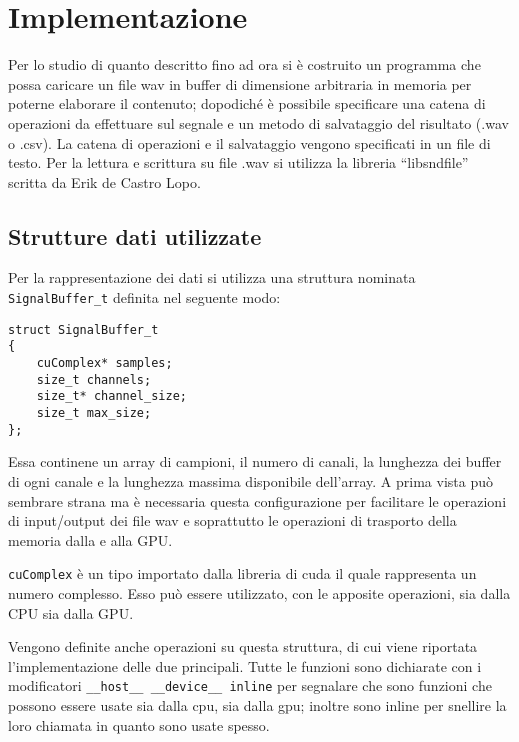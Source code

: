 \chapter{Implementazione}
Per lo studio di quanto descritto fino ad ora si è costruito un programma che possa caricare un file wav in buffer di dimensione arbitraria in memoria per poterne elaborare il contenuto; dopodiché è possibile specificare una catena di operazioni da effettuare sul segnale e un metodo di salvataggio del risultato (.wav o .csv). La catena di operazioni e il salvataggio vengono specificati in un file di testo. Per la lettura e scrittura su file .wav si utilizza la libreria ``libsndfile'' scritta da Erik de Castro Lopo\cite{libsndfile}.

\section{Strutture dati utilizzate}

Per la rappresentazione dei dati si utilizza una struttura nominata \lstinline{SignalBuffer_t} definita nel seguente modo:

\begin{lstlisting}
struct SignalBuffer_t
{
	cuComplex* samples;
	size_t channels;
	size_t* channel_size;
	size_t max_size;
};
\end{lstlisting}

Essa continene un array di campioni, il numero di canali, la lunghezza dei buffer di ogni canale e la lunghezza massima disponibile dell'array. A prima vista può sembrare strana ma è necessaria questa configurazione per facilitare le operazioni di input/output dei file wav e soprattutto le operazioni di trasporto della memoria dalla e alla GPU.

\lstinline{cuComplex} è un tipo importato dalla libreria di cuda il quale rappresenta un numero complesso. Esso può essere utilizzato, con le apposite operazioni, sia dalla CPU sia dalla GPU.

Vengono definite anche operazioni su questa struttura, di cui viene riportata l'implementazione delle due principali. Tutte le funzioni sono dichiarate con i modificatori \lstinline{__host__ __device__ inline} per segnalare che sono funzioni che possono essere usate sia dalla cpu, sia dalla gpu; inoltre sono inline per snellire la loro chiamata in quanto sono usate spesso.

